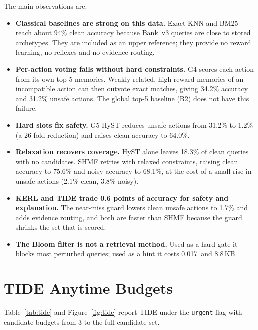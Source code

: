 \documentclass[12pt,a4paper,oneside]{report}
\newcommand{\code}[1]{\texttt{\small #1}}
\newcommand{\ms}{\,\text{ms}}
\begin{document}
\noindent The main observations are:
\begin{itemize}
  \item \textbf{Classical baselines are strong on this data.} Exact KNN and BM25 reach about 94\% clean accuracy because Bank~v3 queries are close to stored archetypes. They are included as an upper reference; they provide no reward learning, no reflexes and no evidence routing.
  \item \textbf{Per-action voting fails without hard constraints.} G4 scores each action from its own top-5 memories. Weakly related, high-reward memories of an incompatible action can then outvote exact matches, giving 34.2\% accuracy and 31.2\% unsafe actions. The global top-5 baseline (B2) does not have this failure.
  \item \textbf{Hard slots fix safety.} G5 HyST reduces unsafe actions from 31.2\% to 1.2\% (a 26-fold reduction) and raises clean accuracy to 64.0\%.
  \item \textbf{Relaxation recovers coverage.} HyST alone leaves 18.3\% of clean queries with no candidates. SHMF retries with relaxed constraints, raising clean accuracy to 75.6\% and noisy accuracy to 68.1\%, at the cost of a small rise in unsafe actions (2.1\% clean, 3.8\% noisy).
  \item \textbf{KERL and TIDE trade 0.6 points of accuracy for safety and explanation.} The near-miss guard lowers clean unsafe actions to 1.7\% and adds evidence routing, and both are faster than SHMF because the guard shrinks the set that is scored.
  \item \textbf{The Bloom filter is not a retrieval method.} Used as a hard gate it blocks most perturbed queries; used as a hint it costs 0.017\ms{} and 8.8\,KB.
\end{itemize}

\section{TIDE Anytime Budgets}
Table~\ref{tab:tide} and Figure~\ref{fig:tide} report TIDE under the \code{urgent} flag with candidate budgets from 3 to the full candidate set.
\end{document}
